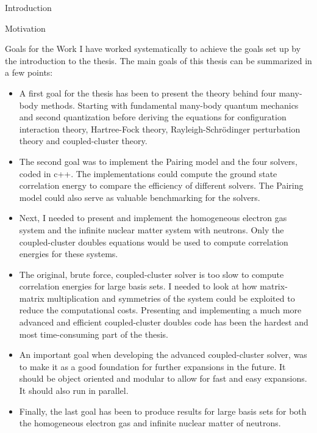 \documentclass[twoside,english]{uiofysmaster}
\begin{document}
\begin{chapter}{Introduction}
\begin{subsection}{Motivation}
	\end{subsection}

	\begin{subsection}{Goals for the Work}
		I have worked systematically to achieve the goals set up by the introduction to the thesis. The main goals of this thesis can be summarized in a few points: 
		\begin{itemize}
			\item A first goal for the thesis has been to
                          present the theory behind four many-body
                          methods. Starting with fundamental many-body
                          quantum mechanics and second quantization
                          before deriving the equations for
                          configuration interaction theory, Hartree-Fock
                          theory, Rayleigh-Schr\"{o}dinger
                          perturbation theory and coupled-cluster
                          theory.
			\item The second goal was to implement the Pairing model and the four solvers, coded in c++. The implementations could compute the ground state correlation energy to compare the efficiency of different solvers. The Pairing model could also serve as valuable benchmarking for the solvers.
			\item Next, I needed to present and implement the homogeneous electron gas system and the infinite nuclear matter system with neutrons. Only the coupled-cluster doubles equations would be used to compute correlation energies for these systems. 
			\item The original, brute force, coupled-cluster solver is too slow to compute correlation energies for large basis sets. I needed to look at how matrix-matrix multiplication and symmetries of the system could be exploited to reduce the computational costs. Presenting and implementing a much more advanced and efficient coupled-cluster doubles code has been the hardest and most time-consuming part of the thesis. 
      \item An important goal when developing the advanced coupled-cluster solver, was to make it as a good foundation for further expansions in the future. It should be object oriented and modular to allow for fast and easy expansions. It should also run in parallel. 
			\item Finally, the last goal has been to produce results for large basis sets for both the homogeneous electron gas and infinite nuclear matter of neutrons.
		\end{itemize}
	\end{subsection}


\end{chapter}
\end{document}
